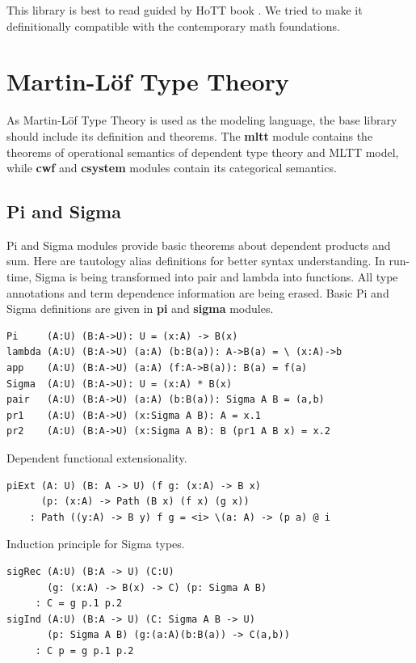 \documentclass{article}
\begin{document}
This library is best to read guided by HoTT book \cite{HoTT}.
We tried to make it definitionally compatible with
the contemporary math foundations.

\section{Martin-Löf Type Theory}

As Martin-Löf Type Theory is used as the modeling language,
the base library should include its definition and theorems.
The {\bf mltt} module contains the theorems of operational semantics of
dependent type theory and MLTT model, while {\bf cwf} and {\bf csystem}
modules contain its categorical semantics.

\subsection{Pi and Sigma}

Pi and Sigma modules provide basic theorems about dependent products and sum.
Here are tautology alias definitions for better syntax understanding.
In run-time, Sigma is being transformed into pair and lambda into functions.
All type annotations and term dependence information are being erased.
Basic Pi and Sigma definitions are given in {\bf pi} and {\bf sigma} modules.

\begin{lstlisting}[mathescape=true]
Pi     (A:U) (B:A->U): U = (x:A) -> B(x)
lambda (A:U) (B:A->U) (a:A) (b:B(a)): A->B(a) = \ (x:A)->b
app    (A:U) (B:A->U) (a:A) (f:A->B(a)): B(a) = f(a)
Sigma  (A:U) (B:A->U): U = (x:A) * B(x)
pair   (A:U) (B:A->U) (a:A) (b:B(a)): Sigma A B = (a,b)
pr1    (A:U) (B:A->U) (x:Sigma A B): A = x.1
pr2    (A:U) (B:A->U) (x:Sigma A B): B (pr1 A B x) = x.2
\end{lstlisting}

Dependent functional extensionality.

\begin{lstlisting}[mathescape=true]
piExt (A: U) (B: A -> U) (f g: (x:A) -> B x)
      (p: (x:A) -> Path (B x) (f x) (g x))
    : Path ((y:A) -> B y) f g = <i> \(a: A) -> (p a) @ i
\end{lstlisting}

Induction principle for Sigma types.

\begin{lstlisting}[mathescape=true]
sigRec (A:U) (B:A -> U) (C:U)
       (g: (x:A) -> B(x) -> C) (p: Sigma A B)
     : C = g p.1 p.2
sigInd (A:U) (B:A -> U) (C: Sigma A B -> U)
       (p: Sigma A B) (g:(a:A)(b:B(a)) -> C(a,b))
     : C p = g p.1 p.2
\end{lstlisting}
\end{document}
